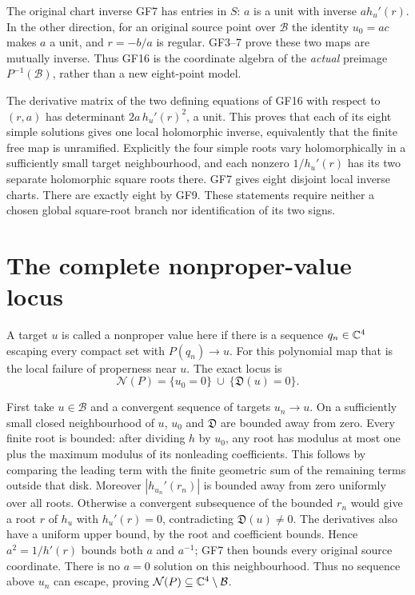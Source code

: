 The original chart inverse GF7 has entries in $S$: $a$ is a unit
with inverse $a h_u'(r)$. In the other direction, for an original
source point over $\mathcal B$ the identity $u_0=ac$ makes $a$
a unit, and $r=-b/a$ is regular. GF3--7 prove these two maps are
mutually inverse. Thus GF16 is the coordinate algebra of the
\emph{actual} preimage $P^{-1}(\mathcal B)$, rather than a new
eight-point model.

The derivative matrix of the two defining equations of GF16 with
respect to $(r,a)$ has determinant
$2a\,h_u'(r)^2$, a unit. This proves that each of its eight simple
solutions gives one local holomorphic inverse, equivalently that
the finite free map is unramified. Explicitly the four simple roots
vary holomorphically in a sufficiently small target neighbourhood,
and each nonzero $1/h_u'(r)$ has its two separate holomorphic
square roots there. GF7 gives eight disjoint local inverse charts.
There are exactly eight by GF9. These statements require neither
a chosen global square-root branch nor identification of its two signs.

\section{The complete nonproper-value locus}
A target $u$ is called a nonproper value here if there is a sequence
$q_n\in\mathbb C^4$ escaping every compact set with $P(q_n)\to u$.
For this polynomial map that is the local failure of properness
near $u$. The exact locus is
\begin{equation}
 \boxed{\quad\mathcal N(P)=\{u_0=0\}\ \cup\ \{\mathfrak D(u)=0\}.\quad}
 \tag{GF17}
\end{equation}

First take $u\in\mathcal B$ and a convergent sequence of targets
$u_n\to u$. On a sufficiently small closed neighbourhood of $u$,
$u_0$ and $\mathfrak D$ are bounded away from zero. Every finite
root is bounded: after dividing $h$ by $u_0$, any root has modulus
at most one plus the maximum modulus of its nonleading
coefficients. This follows by comparing the leading term with
the finite geometric sum of the remaining terms outside that disk.
Moreover $|h_{u_n}'(r_n)|$ is bounded away from zero uniformly over
all roots. Otherwise a convergent subsequence of the bounded
$r_n$ would give a root $r$ of $h_u$ with $h_u'(r)=0$,
contradicting $\mathfrak D(u)\ne0$. The derivatives also have a
uniform upper bound, by the root and coefficient bounds. Hence
$a^2=1/h'(r)$ bounds both $a$ and $a^{-1}$; GF7 then bounds every
original source coordinate. There is no $a=0$ solution on this
neighbourhood. Thus no sequence above $u_n$ can escape, proving
$\mathcal N(P)\subseteq\mathbb C^4\setminus\mathcal B$.

